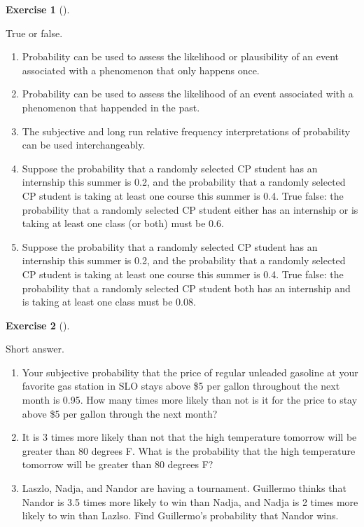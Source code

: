 \documentclass[
  letterpaper,
  DIV=11,
  numbers=noendperiod]{scrreprt}
\providecommand{\tightlist}{%
  \setlength{\itemsep}{0pt}\setlength{\parskip}{0pt}}
\theoremstyle{plain}
\theoremstyle{definition}
\theoremstyle{definition}
\newtheorem{exercise}{Exercise}[chapter]
\theoremstyle{definition}
\theoremstyle{remark}
\begin{document}
\begin{exercise}[]\protect\hypertarget{exr-TF1}{}\label{exr-TF1}

True or false.

\begin{enumerate}
\def\labelenumi{\arabic{enumi}.}
\tightlist
\item
  Probability can be used to assess the likelihood or plausibility of an
  event associated with a phenomenon that only happens once.
\item
  Probability can be used to assess the likelihood of an event
  associated with a phenomenon that happended in the past.
\item
  The subjective and long run relative frequency interpretations of
  probability can be used interchangeably.
\item
  Suppose the probability that a randomly selected CP student has an
  internship this summer is 0.2, and the probability that a randomly
  selected CP student is taking at least one course this summer is 0.4.
  True false: the probability that a randomly selected CP student either
  has an internship or is taking at least one class (or both) must be
  0.6.
\item
  Suppose the probability that a randomly selected CP student has an
  internship this summer is 0.2, and the probability that a randomly
  selected CP student is taking at least one course this summer is 0.4.
  True false: the probability that a randomly selected CP student both
  has an internship and is taking at least one class must be 0.08.
\end{enumerate}

\end{exercise}

\begin{exercise}[]\protect\hypertarget{exr-SA1}{}\label{exr-SA1}

Short answer.

\begin{enumerate}
\def\labelenumi{\arabic{enumi}.}
\tightlist
\item
  Your subjective probability that the price of regular unleaded
  gasoline at your favorite gas station in SLO stays above \$5 per
  gallon throughout the next month is 0.95. How many times more likely
  than not is it for the price to stay above \$5 per gallon through the
  next month?
\item
  It is 3 times more likely than not that the high temperature tomorrow
  will be greater than 80 degrees F. What is the probability that the
  high temperature tomorrow will be greater than 80 degrees F?
\item
  Laszlo, Nadja, and Nandor are having a tournament. Guillermo thinks
  that Nandor is 3.5 times more likely to win than Nadja, and Nadja is 2
  times more likely to win than Lazlso. Find Guillermo's probability
  that Nandor wins.
\end{enumerate}

\end{exercise}
\end{document}
